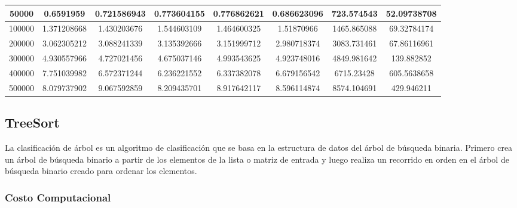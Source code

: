 \documentclass{article}
\begin{document}
\begin{table}[]
\begin{tabular}{|c|c|c|c|c|c|c|c| }
    50000	&0.6591959	    &0.721586943	&0.773604155	&0.776862621	&0.686623096	&723.574543	 	&52.09738708\\ \hline
    100000	&1.371208668	&1.430203676	&1.544603109	&1.464600325	&1.51870966	     &1465.865088	 	&69.32784174\\ \hline
    200000	&3.062305212	&3.088241339	&3.135392666	&3.151999712	&2.980718374	&3083.731461	 	&67.86116961\\ \hline
    300000	&4.930557966	&4.727021456	&4.675037146	&4.993543625	&4.923748016	&4849.981642	 	&139.882852\\ \hline
    400000	&7.751039982	&6.572371244	&6.236221552	&6.337382078	&6.679156542	&6715.23428	 	&605.5638658\\ \hline
    500000	&8.079737902	&9.067592859	&8.209435701	&8.917642117	&8.596114874	&8574.104691	 	&429.946211\\ \hline
        \end{tabular}
    \end{table}
              
    \subsection{TreeSort}
    La clasificación de árbol es un algoritmo de clasificación que se basa en la estructura de datos del árbol de búsqueda binaria. Primero crea un árbol de búsqueda binario a partir de los elementos de la lista o matriz de entrada y luego realiza un recorrido en orden en el árbol de búsqueda binario creado para ordenar los elementos.
        \subsubsection{Costo Computacional}
\end{document}
